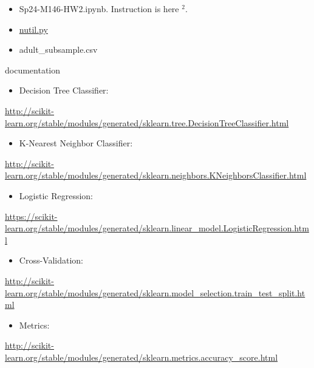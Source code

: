 \documentclass[10pt]{article}
\begin{document}
\begin{itemize}
  \item Sp24-M146-HW2.ipynb. Instruction is here ${ }^{2}$.
  \item \href{http://nutil.py}{nutil.py}
  \item adult\_subsample.csv
\end{itemize}

documentation

\begin{itemize}
  \item Decision Tree Classifier:
\end{itemize}

\href{http://scikit-learn.org/stable/modules/generated/sklearn.tree.DecisionTreeClassifier.html}{http://scikit-learn.org/stable/modules/generated/sklearn.tree.DecisionTreeClassifier.html}

\begin{itemize}
  \item K-Nearest Neighbor Classifier:
\end{itemize}

\href{http://scikit-learn.org/stable/modules/generated/sklearn.neighbors.KNeighborsClassifier.html}{http://scikit-learn.org/stable/modules/generated/sklearn.neighbors.KNeighborsClassifier.html}

\begin{itemize}
  \item Logistic Regression:
\end{itemize}

\href{https://scikit-learn.org/stable/modules/generated/sklearn.linear_model.LogisticRegression.html}{https://scikit-learn.org/stable/modules/generated/sklearn.linear\_model.LogisticRegression.html}

\begin{itemize}
  \item Cross-Validation:
\end{itemize}

\href{http://scikit-learn.org/stable/modules/generated/sklearn.model_selection.train_test_split.html}{http://scikit-learn.org/stable/modules/generated/sklearn.model\_selection.train\_test\_split.html}

\begin{itemize}
  \item Metrics:
\end{itemize}

\href{http://scikit-learn.org/stable/modules/generated/sklearn.metrics.accuracy_score.html}{http://scikit-learn.org/stable/modules/generated/sklearn.metrics.accuracy\_score.html}
\end{document}

